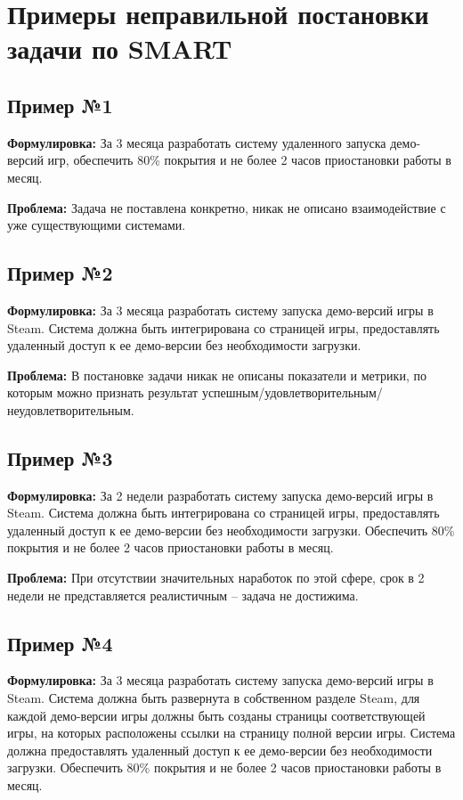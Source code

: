 \documentclass[12pt, a4paper]{article}
\begin{document}
\newpage
\section{Примеры неправильной постановки задачи по SMART}
\subsection{Пример №1}
\textbf{Формулировка:} За 3 месяца разработать систему удаленного запуска демо-версий игр, обеспечить 80\% покрытия и не более 2 часов приостановки работы в месяц.

\textbf{Проблема:} Задача не поставлена конкретно, никак не описано взаимодействие с уже существующими системами.

\subsection{Пример №2}
\textbf{Формулировка:} За 3 месяца разработать систему запуска демо-версий игры в Steam. Система должна быть интегрирована со страницей игры, предоставлять удаленный доступ к ее демо-версии без необходимости загрузки. 

\textbf{Проблема:} В постановке задачи никак не описаны показатели и метрики, по которым можно признать результат успешным/удовлетворительным/неудовлетворительным.
\subsection{Пример №3}
\textbf{Формулировка:} За 2 недели разработать систему запуска демо-версий игры в Steam. Система должна быть интегрирована со страницей игры, предоставлять удаленный доступ к ее демо-версии без необходимости загрузки. Обеспечить 80\% покрытия и не более 2 часов приостановки работы в месяц.

\textbf{Проблема:} При отсутствии значительных наработок по этой сфере, срок в 2 недели не представляется реалистичным -- задача не достижима.
\subsection{Пример №4}
\textbf{Формулировка:} За 3 месяца разработать систему запуска демо-версий игры в Steam. Система должна быть развернута в собственном разделе Steam, для каждой демо-версии игры должны быть созданы страницы соответствующей игры, на которых расположены ссылки на страницу полной версии игры. Система должна предоставлять удаленный доступ к ее демо-версии без необходимости загрузки. Обеспечить 80\% покрытия и не более 2 часов приостановки работы в месяц.
\end{document}
